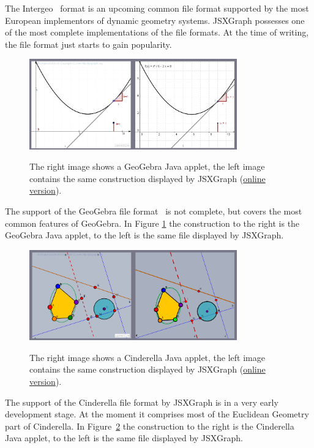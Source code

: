 \documentclass[12pt,a4paper]{article}%
\begin{document}
The Intergeo~\cite{kortenkamp2009} format is an upcoming common file format supported by the most European implementors of dynamic geometry systems. JSXGraph possesses one of the most complete implementations of the file formats. At the time of writing, the file format just starts to gain popularity. 

\begin{figure}[ht]
\begin{center}
\includegraphics[width=0.8\textwidth]{geogebra.png}\\
\caption{The right image shows a GeoGebra Java applet, 
the left image contains the same construction displayed 
by JSXGraph
(\href{http://jsxgraph.uni-bayreuth.de/talks/cadgme10/talk/jsx_ggb.html}{online version}).}\label{fig:geogebra}
\end{center}
\end{figure}
The support of the GeoGebra file format~\cite{hohenwarter2005} is not complete, 
but covers the most common features of GeoGebra. 
In Figure \ref{fig:geogebra} the construction to the right is the GeoGebra Java applet, 
to the left is the same file displayed by JSXGraph.


\begin{figure}[ht]
\begin{center}
\includegraphics[width=0.8\textwidth]{cindy.png}\\
\caption{The right image shows a Cinderella Java applet, 
the left image contains the same construction displayed 
by JSXGraph 
(\href{http://jsxgraph.uni-bayreuth.de/talks/cadgme10/talk/jsx_cdy.html}{online version}).}\label{fig:cindy}
\end{center}
\end{figure}
The support of the Cinderella file format \cite{kortenkamp1999} by JSXGraph is in a very early development stage. At the moment it comprises most of the Euclidean Geometry part of Cinderella. In Figure~\ref{fig:cindy} the construction to the right is the Cinderella Java applet, to the left is the same file displayed by JSXGraph.
\end{document}
